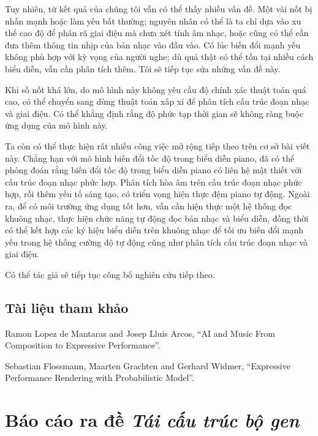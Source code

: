 \documentclass[11pt]{article}
\begin{document}
Tuy nhiên, từ kết quả của chúng tôi vẫn có thể thấy nhiều vấn đề. Một vài nốt
bị nhấn mạnh hoặc làm yếu bất thường; nguyên nhân có thể là ta chỉ dựa vào xu
thế cao độ để phân rã giai điệu mà chưa xét tính âm nhạc, hoặc cũng có thể
cần đưa thêm thông tin nhịp của bản nhạc vào đầu vào. Có lúc biến đổi mạnh
yếu không phù hợp với kỳ vọng của người nghe; dù quả thật có thể tồn tại
nhiều cách biểu diễn, vẫn cần phân tích thêm. Tôi sẽ tiếp tục sửa những vấn
đề này.

Khi số nốt khá lớn, do mô hình này không yêu cầu độ chính xác thuật toán quá
cao, có thể chuyển sang dùng thuật toán xấp xỉ để phân tích cấu trúc đoạn
nhạc và giai điệu. Có thể khẳng định rằng độ phức tạp thời gian sẽ không ràng
buộc ứng dụng của mô hình này.

Ta còn có thể thực hiện rất nhiều công việc mở rộng tiếp theo trên cơ sở bài
viết này. Chẳng hạn với mô hình biến đổi tốc độ trong biểu diễn piano, đã có
thể phỏng đoán rằng biến đổi tốc độ trong biểu diễn piano có liên hệ mật thiết
với cấu trúc đoạn nhạc phức hợp. Phân tích hòa âm trên cấu trúc đoạn nhạc
phức hợp, rồi thêm yếu tố sáng tạo, có triển vọng hiện thực đệm piano tự
động. Ngoài ra, để có môi trường ứng dụng tốt hơn, vẫn cần hiện thực một hệ
thống đọc khuông nhạc, thực hiện chức năng tự động đọc bản nhạc và biểu diễn,
đồng thời có thể kết hợp các ký hiệu biểu diễn trên khuông nhạc để tối ưu
biến đổi mạnh yếu trong hệ thống cường độ tự động cũng như phân tích cấu trúc
đoạn nhạc và giai điệu.

Có thể tác giả sẽ tiếp tục công bố nghiên cứu tiếp theo.

\subsection*{Tài liệu tham khảo}

\begin{enumerate}[label={[\arabic*]}]
  \item Ramon Lopez de Mantaras and Josep Lluis Arcos, ``AI and Music From
  Composition to Expressive Performance''.

  \item Sebastian Flossmann, Maarten Grachten and Gerhard Widmer, ``Expressive
  Performance Rendering with Probabilistic Model''.
\end{enumerate}

\section{Báo cáo ra đề \texorpdfstring{\emph{Tái cấu trúc bộ gen}}{Tái cấu trúc bộ gen}}
\end{document}

